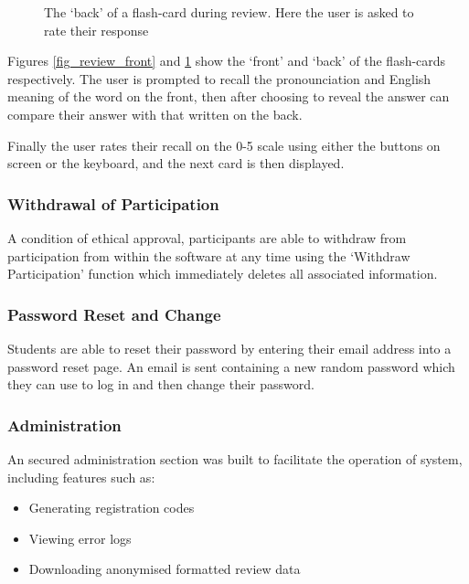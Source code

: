 \begin{figure}
\caption{The `back' of a flash-card during review. Here the user is asked to rate
their response}
\label{fig_review_back}
\end{figure}

Figures \ref{fig_review_front} and \ref{fig_review_back} show the `front' and `back' of the
flash-cards respectively. The user is prompted to recall the pronounciation and English
meaning of the word on the front, then after choosing to reveal the answer can compare
their answer with that written on the back.

Finally the user rates their recall on the 0-5 scale using either the buttons on screen or
the keyboard, and the next card is then displayed.

\subsubsection{Withdrawal of Participation}
A condition of ethical approval, participants are able to withdraw
from participation from within the software at any time
using the `Withdraw Participation' function which immediately deletes all associated
information.

\subsubsection{Password Reset and Change}
Students are able to reset their password by entering their email address into a
password reset page. An email is sent containing a new random password which they
can use to log in and then change their password.
 

\subsubsection{Administration}
An secured administration section was built to facilitate the operation of system, including
features such as:
\begin{itemize}
  \item Generating registration codes
  \item Viewing error logs
  \item Downloading anonymised formatted review data
\end{itemize} 

